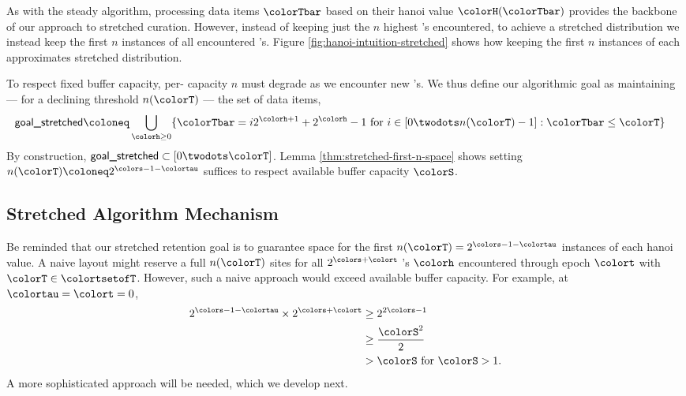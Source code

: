 As with the steady algorithm, processing data items $\colorTbar$ based on their hanoi value $\colorH(\colorTbar)$ provides the backbone of our approach to stretched curation.
However, instead of keeping just the $n$ highest \hv{}'s encountered, to achieve a stretched distribution we instead keep the first $n$ instances of all encountered \hv{}'s.
Figure \ref{fig:hanoi-intuition-stretched} shows how keeping the first $n$ instances of each \hv{} approximates stretched distribution.

To respect fixed buffer capacity, per-\hv{} capacity $n$ must degrade as we encounter new \hv{}'s.
We thus define our algorithmic goal as maintaining --- for a declining threshold $n(\colorT)$ --- the set of data items,
\begin{align*}
\textsf{goal\_stretched}
&\coloneq
\bigcup_{\colorh \geq 0}
\{ \colorTbar = i2^{\colorh + 1} + 2^{\colorh} - 1 \text{ for } i \in [0 \twodots n(\colorT) - 1] : \colorTbar \leq \colorT \}
\end{align*}
By construction, $\textsf{goal\_stretched} \subset [0 \twodots \colorT]$.
Lemma \ref{thm:stretched-first-n-space} shows setting $n(\colorT) \coloneq 2^{\colors - 1 - \colortau}$ suffices to respect available buffer capacity $\colorS$.


\FloatBarrier  %


\subsection{Stretched Algorithm Mechanism}
\label{sec:stretched-mechanism}



Be reminded that our stretched retention goal is to guarantee space for the first $n(\colorT) =  2^{\colors - 1 - \colortau}$ instances of each hanoi value.
A naive layout might reserve a full $n(\colorT)$ sites for all $2^{\colors + \colort}$ \hv{}'s $\colorh$ encountered through epoch $\colort$ with $\colorT \in \colortsetofT$.
However, such a naive approach would exceed available buffer capacity.
For example, at $\colortau=\colort=0$,
\begin{align*}
2^{\colors - 1 - \colortau} \times 2^{\colors + \colort}
&\geq
2^{2\colors - 1}\\
&\geq
\frac{\colorS^{2}}{2}\\
&> \colorS \text{ for } \colorS > 1.
\end{align*}
A more sophisticated approach will be needed, which we develop next.

